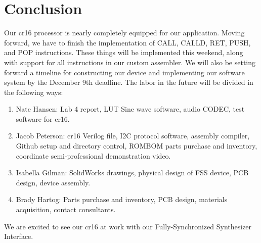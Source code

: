 \documentclass[conference]{IEEEtran}
\begin{document}
\section{Conclusion}
Our cr16 processor is nearly completely equipped for our application. Moving forward, we have to finish the implementation of CALL, CALLD, RET, PUSH, and POP instructions. These things will be implemented this weekend, along with support for all instructions in our custom assembler. We will also be setting forward a timeline for constructing our device and implementing our software system by the December 9th deadline. The labor in the future will be divided in the following ways:
\begin{enumerate}
    \item Nate Hansen: Lab 4 report, LUT Sine wave software, audio CODEC, test software for cr16.
    \item Jacob Peterson: cr16 Verilog file, I2C protocol software, assembly compiler, Github setup and directory control, ROMBOM parts purchase and inventory, coordinate semi-professional demonstration video.
    \item Isabella Gilman: SolidWorks drawings, physical design of FSS device, PCB design, device assembly.
    \item Brady Hartog: Parts purchase and inventory, PCB design, materials acquisition, contact consultants.
\end{enumerate}

We are excited to see our cr16 at work with our Fully-Synchronized Synthesizer Interface. 



\clearpage
{}

\end{document}
